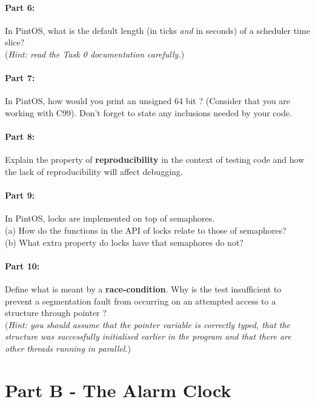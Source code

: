 \documentclass[a4paper,11pt]{article}
\begin{document}
\paragraph{Part 6:}
In PintOS, what is the default length (in ticks \emph{and} in seconds) of a scheduler time slice? \\
(\textit{Hint: read the Task 0 documentation carefully.})

\paragraph{Part 7:}
In PintOS, how would you print an unsigned 64 bit ?
(Consider that you are working with C99).
Don't forget to state any inclusions needed by your code.

\paragraph{Part 8:}
Explain the property of {\bf reproducibility} in the context of testing code and how the lack of reproducibility will affect debugging.

\paragraph{Part 9:}
In PintOS, locks are implemented on top of semaphores.\\
(a) How do the functions in the API of locks relate to those of semaphores?\\
(b) What extra property do locks have that semaphores do not?

\paragraph{Part 10:}
Define what is meant by a {\bf race-condition}. Why is the test 
insufficient to prevent a segmentation fault from occurring on an attempted access to a structure through pointer ?\\
(\textit{Hint: you should assume that the pointer variable is correctly typed, that the structure was successfully initialised earlier in the program 
and that there are other threads running in parallel.})

\pagebreak
\section*{Part B - The Alarm Clock}
\end{document}
